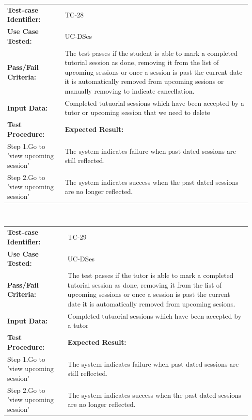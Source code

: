 \documentclass[12pt]{article}
\begin{document}
\begin{tabular}{| p{8cm} | p{8cm} |} \hline
	\textbf{Test-case Identifier:}& TC-28\\
	\textbf{Use Case Tested:}& UC-DSes\\
	\textbf{Pass/Fail Criteria:}& The test passes if the student is able to mark a completed tutorial session as done, removing it from the list of upcoming sessions or once a session is past the current date it is automatically removed from upcoming sesions or manually removing to indicate cancellation.\\
	\textbf{Input Data:}& Completed tutuorial sessions which have been accepted by a tutor or upcoming session that we need to delete\\\hline
	\textbf{Test Procedure:}& \textbf{Expected Result:} \\\hline
	Step 1.Go to 'view upcoming session' & The system indicates failure when past dated sessions are still reflected. \\
	Step 2.Go to 'view upcoming session' & The system indicates success when the past dated sessions are no longer reflected. \\
		\hline
\end{tabular}
\\

\begin{tabular}{| p{8cm} | p{8cm} |} \hline
	\textbf{Test-case Identifier:}& TC-29\\
	\textbf{Use Case Tested:}& UC-DSes\\
	\textbf{Pass/Fail Criteria:}& The test passes if the tutor is able to mark a completed tutorial session as done, removing it from the list of upcoming sessions or once a session is past the current date it is automatically removed from upcoming sesions.\\
	\textbf{Input Data:}& Completed tutuorial sessions which have been accepted by a tutor\\\hline
	\textbf{Test Procedure:}& \textbf{Expected Result:} \\\hline
	Step 1.Go to 'view upcoming session' & The system indicates failure when past dated sessions are still reflected. \\
	Step 2.Go to 'view upcoming session' & The system indicates success when the past dated sessions are no longer reflected. \\
		\hline
\end{tabular}
\\
\end{document}
